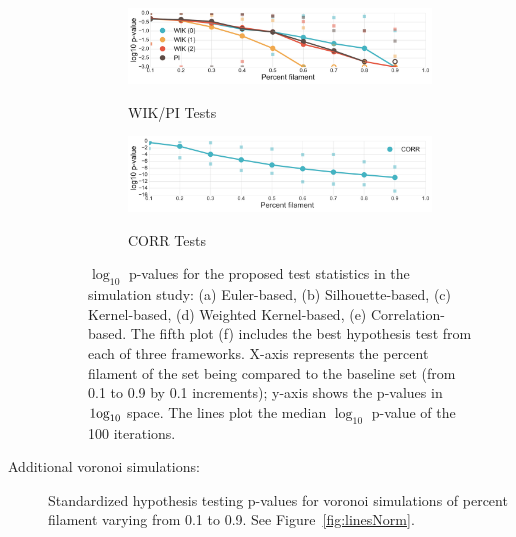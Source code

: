 \documentclass[12pt]{article}
\newcommand{\figref}[1]{Figure~\ref{#1}}
\begin{document}
\begin{description}
\begin{center}
\begin{figure}[htp!]
\begin{subfigure}{.5\textwidth}
        \label{fig:all_contour}
      \end{subfigure}
      \begin{subfigure}{.5\textwidth}
        \centering
        \caption{WIK/PI Tests}
        \includegraphics[width=\linewidth]{figure_8_all_weighted_contour_group.pdf}
        \label{fig:all_weight}
      \end{subfigure}
      \begin{subfigure}{.5\textwidth}
        \caption{CORR Tests}
        \includegraphics[width=\linewidth]{figure_8_all_correlation_group.pdf}
        \label{fig:all_corr}
      \end{subfigure}
      \caption{$\log_{10}$ p-values for the proposed test statistics in the simulation study: (a) Euler-based, (b) Silhouette-based, (c) Kernel-based, (d) Weighted Kernel-based, (e) Correlation-based. The fifth plot (f) includes the best hypothesis test from each of three frameworks. X-axis represents the percent filament of the set being compared to the baseline set (from 0.1 to 0.9 by 0.1 increments); y-axis shows the p-values in $\textup{1og}_{10}$ space. The lines plot the median $\log_{10}$ p-value of the 100 iterations. }
      \label{fig:linesUnnorm}
    \end{figure}
  \end{center}

  \item[Additional voronoi simulations:] Standardized hypothesis testing p-values for voronoi simulations of percent filament varying from 0.1 to 0.9. See \figref{fig:linesNorm}.


\end{description}
\end{document}
